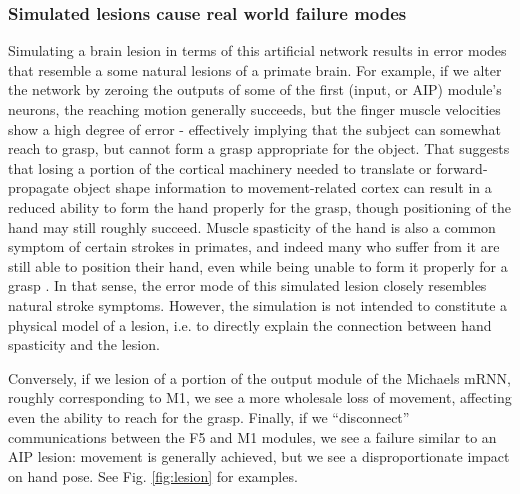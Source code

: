 \documentclass[12pt]{iopart}
\begin{document}
\subsubsection{Simulated lesions cause real world failure modes}
Simulating a brain lesion in terms of this artificial network results in error
modes that resemble a some natural lesions of a primate brain. For example, if we
alter the network by zeroing the outputs of some of the first (input, or AIP) module's neurons,
the reaching motion generally succeeds, but the finger muscle velocities show a high degree
of error - effectively implying that the subject can somewhat reach to grasp, but cannot form a
grasp appropriate for the object. That suggests that losing a portion of the cortical
machinery needed to translate or forward-propagate object shape information
to movement-related cortex can result in a reduced ability to form the hand properly for
the grasp, though positioning of the hand may still roughly succeed. Muscle spasticity of
the hand is also a common symptom of certain strokes in primates, and indeed many who
suffer from it are still able to position their hand, even while being unable to form
it properly for a grasp \cite{khanna.openloop}. In that sense, the error mode of this
simulated lesion closely resembles natural stroke symptoms. However, the simulation is not
intended to constitute a physical model of a lesion, i.e. to directly explain the
connection between hand spasticity and the lesion.

Conversely, if we lesion of a portion of the output module of the Michaels mRNN, roughly
corresponding to M1, we see a more wholesale loss of movement, affecting even the
ability to reach for the grasp. Finally, if we ``disconnect'' communications between the
F5 and M1 modules, we see a failure similar to an AIP lesion: movement is generally
achieved, but we see a disproportionate impact on hand pose.
See Fig. \ref{fig:lesion} for examples.
\end{document}
